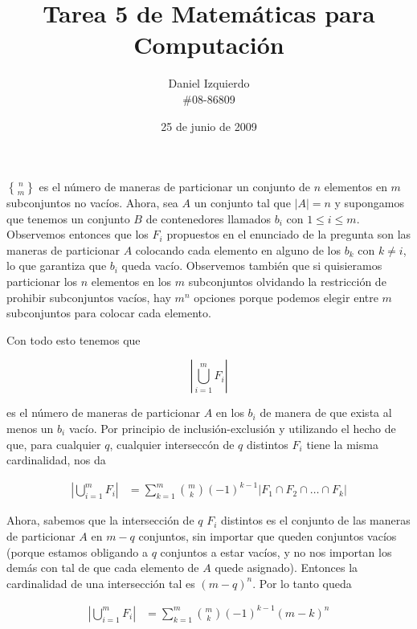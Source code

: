\documentclass{article}
\newcommand{\stirlingD}[2]{\genfrac{\{}{\}}{0pt}{}{#1}{#2}}
\begin{document}

\title{Tarea 5 de Matemáticas para Computación}
\author{Daniel Izquierdo \\ \#08-86809}
\date{25 de junio de 2009}

\maketitle

\section{}

$\stirlingD{n}{m}$ es el número de maneras de particionar un conjunto de $n$
elementos en $m$ subconjuntos no vacíos. Ahora, sea $A$ un conjunto
tal que $|A| = n$ y supongamos que tenemos un conjunto $B$ de contenedores
llamados $b_i$ con $1 \leq i \leq m$. Observemos entonces que los $F_i$
propuestos en el enunciado de la pregunta son las maneras de particionar $A$
colocando cada elemento en alguno de los $b_k$ con $k \neq i$, lo que garantiza
que $b_i$ queda vacío. Observemos también que si quisieramos particionar los $n$
elementos en los $m$ subconjuntos olvidando la restricción de prohibir
subconjuntos vacíos, hay $m^n$ opciones porque podemos elegir entre $m$
subconjuntos para colocar cada elemento.

Con todo esto tenemos que

\[ \left| \bigcup_{i=1}^m F_i \right| \]

es el número de maneras de particionar $A$ en los $b_i$ de manera de que exista
al menos un $b_i$ vacío. Por principio de inclusión-exclusión y utilizando el
hecho de que, para cualquier $q$, cualquier interseccón de $q$ distintos $F_i$
tiene la misma
cardinalidad, nos da

\begin{align*}
\left| \bigcup_{i=1}^m F_i \right| & = \sum_{k=1}^m \binom{m}{k} (-1)^{k-1} |F_1 \cap F_2 \cap \ldots \cap F_k|
\end{align*}

Ahora, sabemos que la intersección de $q$ $F_i$ distintos es el conjunto de las
maneras de particionar $A$ en $m-q$ conjuntos, sin importar que queden conjuntos
vacíos (porque estamos obligando a $q$ conjuntos a estar vacíos, y no nos
importan los demás con tal de que cada elemento de $A$ quede asignado). Entonces
la cardinalidad de una intersección tal es $(m-q)^n$. Por lo tanto queda

\begin{align*}
\left| \bigcup_{i=1}^m F_i \right| & = \sum_{k=1}^m \binom{m}{k} (-1)^{k-1} (m-k)^n
\end{align*}
\end{document}
